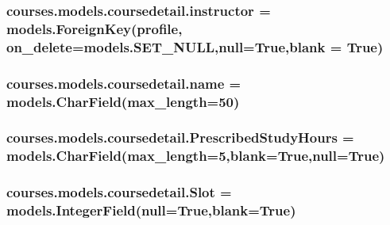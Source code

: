 \subsubsection[{\texorpdfstring{instructor}{instructor}}]{\setlength{\rightskip}{0pt plus 5cm}courses.\+models.\+coursedetail.\+instructor = models.\+Foreign\+Key({\bf profile}, on\+\_\+delete=models.\+S\+E\+T\+\_\+\+N\+U\+LL,null=True,blank = True)\hspace{0.3cm}{\ttfamily [static]}}\hypertarget{classcourses_1_1models_1_1coursedetail_aa4921021a1e28f780255c438617a0a74}{}\label{classcourses_1_1models_1_1coursedetail_aa4921021a1e28f780255c438617a0a74}
\subsubsection[{\texorpdfstring{name}{name}}]{\setlength{\rightskip}{0pt plus 5cm}courses.\+models.\+coursedetail.\+name = models.\+Char\+Field(max\+\_\+length=50)\hspace{0.3cm}{\ttfamily [static]}}\hypertarget{classcourses_1_1models_1_1coursedetail_a1790df7e26de965bd7c457c2757e1222}{}\label{classcourses_1_1models_1_1coursedetail_a1790df7e26de965bd7c457c2757e1222}
\subsubsection[{\texorpdfstring{Prescribed\+Study\+Hours}{PrescribedStudyHours}}]{\setlength{\rightskip}{0pt plus 5cm}courses.\+models.\+coursedetail.\+Prescribed\+Study\+Hours = models.\+Char\+Field(max\+\_\+length=5,blank=True,null=True)\hspace{0.3cm}{\ttfamily [static]}}\hypertarget{classcourses_1_1models_1_1coursedetail_a02223dcd8341b9f202a17d08fe079282}{}\label{classcourses_1_1models_1_1coursedetail_a02223dcd8341b9f202a17d08fe079282}
\subsubsection[{\texorpdfstring{Slot}{Slot}}]{\setlength{\rightskip}{0pt plus 5cm}courses.\+models.\+coursedetail.\+Slot = models.\+Integer\+Field(null=True,blank=True)\hspace{0.3cm}{\ttfamily [static]}}\hypertarget{classcourses_1_1models_1_1coursedetail_abe2db276d6eceaa133f8a9c71f63fb16}{}\label{classcourses_1_1models_1_1coursedetail_abe2db276d6eceaa133f8a9c71f63fb16}
